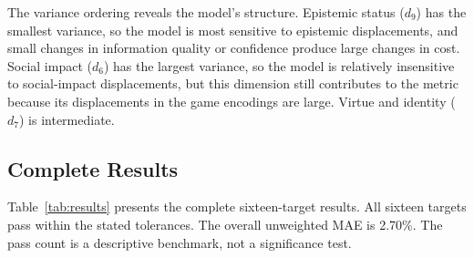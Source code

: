 \documentclass[journal]{IEEEtran}
\begin{document}
The variance ordering reveals the model's structure.
Epistemic status ($d_9$) has the smallest variance, so the model is most sensitive to epistemic displacements, and small changes in information quality or confidence produce large changes in cost.
Social impact ($d_6$) has the largest variance, so the model is relatively insensitive to social-impact displacements, but this dimension still contributes to the metric because its displacements in the game encodings are large.
Virtue and identity ($d_7$) is intermediate.

\subsection{Complete Results}

Table~\ref{tab:results} presents the complete sixteen-target results.
All sixteen targets pass within the stated tolerances.
The overall unweighted MAE is 2.70\%.
The pass count is a descriptive benchmark, not a significance test.
\end{document}
